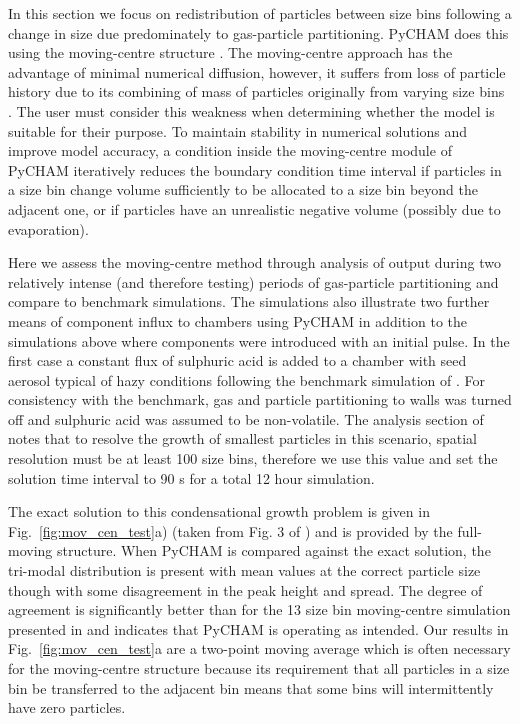 \documentclass[gmd, manuscript]{copernicus}
\begin{document}
In this section we focus on redistribution of particles between size bins following a change in size due predominately to gas-particle partitioning.  PyCHAM does this using the moving-centre structure \citep{Jacobson2005}.  The moving-centre approach has the advantage of minimal numerical diffusion, however, it suffers from loss of particle history due to its combining of mass of particles originally from varying size bins \citep{Zhang1999}.  The user must consider this weakness when determining whether the model is suitable for their purpose.  To maintain stability in numerical solutions and improve model accuracy, a condition inside the moving-centre module of PyCHAM iteratively reduces the boundary condition time interval if particles in a size bin change volume sufficiently to be allocated to a size bin beyond the adjacent one, or if particles have an unrealistic negative volume (possibly due to evaporation).

Here we assess the moving-centre method through analysis of output during two relatively intense (and therefore testing) periods of gas-particle partitioning and compare to benchmark simulations.  The simulations also illustrate two further means of component influx to chambers using PyCHAM in addition to the simulations above where components were introduced with an initial pulse.  In the first case a constant flux of sulphuric acid is added to a chamber with seed aerosol typical of hazy conditions following the benchmark simulation of \citet{Zhang1999}.  For consistency with the benchmark, gas and particle partitioning to walls was turned off and sulphuric acid was assumed to be non-volatile.  The analysis section of \citet{Zhang1999} notes that to resolve the growth of smallest particles in this scenario, spatial resolution must be at least 100 size bins, therefore we use this value and set the solution time interval to 90 s for a total 12 hour simulation.  

The exact solution to this condensational growth problem is given in Fig.~\ref{fig:mov_cen_test}a) (taken from Fig. 3 of \citet{Zhang1999}) and is provided by the full-moving structure.  When PyCHAM is compared against the exact solution, the tri-modal distribution is present with mean values at the correct particle size though with some disagreement in the peak height and spread.  The degree of agreement is significantly better than for the 13 size bin moving-centre simulation presented in \citet{Zhang1999} and indicates that PyCHAM is operating as intended.  Our results in Fig.~\ref{fig:mov_cen_test}a are a two-point moving average which is often necessary for the moving-centre structure because its requirement that all particles in a size bin be transferred to the adjacent bin means that some bins will intermittently have zero particles.
\end{document}
